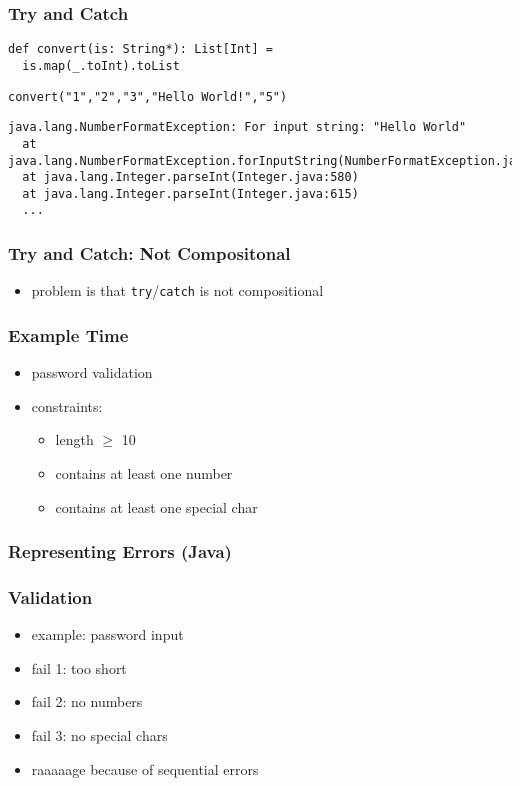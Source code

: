 \documentclass{beamer}
\begin{document}
\begin{frame}[fragile]
  \frametitle{Try and Catch}
\begin{verbatim}
def convert(is: String*): List[Int] =
  is.map(_.toInt).toList
\end{verbatim}

\begin{verbatim}
convert("1","2","3","Hello World!","5")
\end{verbatim}
\begin{verbatim}
java.lang.NumberFormatException: For input string: "Hello World"
  at java.lang.NumberFormatException.forInputString(NumberFormatException.java:65)
  at java.lang.Integer.parseInt(Integer.java:580)
  at java.lang.Integer.parseInt(Integer.java:615)
  ...
\end{verbatim}
\end{frame}

\begin{frame}
  \frametitle{Try and Catch: Not Compositonal}
  \begin{itemize}
  \item problem is that \texttt{try}/\texttt{catch} is not compositional
  \end{itemize}
\end{frame}

\begin{frame}[fragile]
  \frametitle{Example Time}
  \begin{itemize}
  \item password validation
  \item constraints:
    \begin{itemize}
    \item length $\geq$ 10
    \item contains at least one number
    \item contains at least one special char
    \end{itemize}
  \end{itemize}
\end{frame}

\begin{frame}[fragile]
  \frametitle{Representing Errors (Java)}
\end{frame}

\begin{frame}
  \frametitle{Validation}
  \begin{itemize}
  \item example: password input
  \item fail 1: too short
  \item fail 2: no numbers
  \item fail 3: no special chars
  \item raaaaage because of sequential errors
  \end{itemize}
\end{frame}
\end{document}
